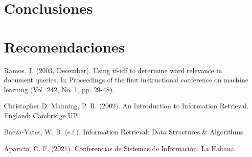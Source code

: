 \documentclass{llncs}
\begin{document}
\section{Conclusiones}\label{sec:conc}


\section{Recomendaciones}\label{sec:rec}



%
%
\begin{thebibliography}{}
%

Ramos, J. (2003, December). Using tf-idf to determine word relevance in
document queries. In Proceedings of the first instructional conference on
machine learning (Vol. 242, No. 1, pp. 29-48).

\bibitem{}
Christopher D. Manning, P. R. (2009). An Introduction to Information Retrieval.
England: Cambridge UP.

\bibitem{}
Baeza-Yates, W. B. (s.f.). Information Retrieval: Data Structures \&
Algorithms.

\bibitem{}
Aparicio, C. F. (2021). Conferencias de Sistemas de Información. La Habana.


\end{thebibliography}
\clearpage
{} %
\renewcommand{\indexname}{Subject Index}

\end{document}
